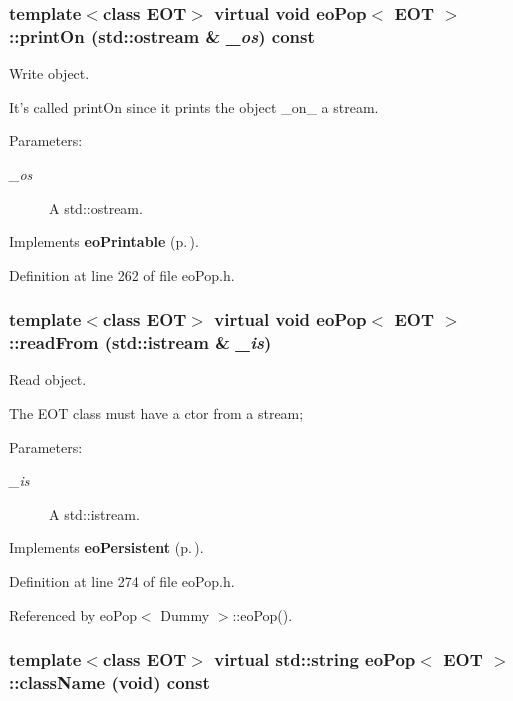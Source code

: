 \subsubsection{\setlength{\rightskip}{0pt plus 5cm}template$<$class EOT$>$ virtual void {\bf eo\-Pop}$<$ {\bf EOT} $>$::print\-On (std::ostream \& {\em \_\-os}) const\hspace{0.3cm}{\tt  [inline, virtual]}}\label{classeo_pop_a18}


Write object. 

It's called print\-On since it prints the object \_\-on\_\- a stream. \begin{Desc}
\item[Parameters:]
\begin{description}
\item[{\em \_\-os}]A std::ostream. \end{description}
\end{Desc}


Implements {\bf eo\-Printable} {\rm (p.\,\pageref{classeo_printable_a1})}.

Definition at line 262 of file eo\-Pop.h.
\subsubsection{\setlength{\rightskip}{0pt plus 5cm}template$<$class EOT$>$ virtual void {\bf eo\-Pop}$<$ {\bf EOT} $>$::read\-From (std::istream \& {\em \_\-is})\hspace{0.3cm}{\tt  [inline, virtual]}}\label{classeo_pop_z19_0}


Read object. 

The EOT class must have a ctor from a stream; \begin{Desc}
\item[Parameters:]
\begin{description}
\item[{\em \_\-is}]A std::istream. \end{description}
\end{Desc}


Implements {\bf eo\-Persistent} {\rm (p.\,\pageref{classeo_persistent_a1})}.

Definition at line 274 of file eo\-Pop.h.

Referenced by eo\-Pop$<$ Dummy $>$::eo\-Pop().
\subsubsection{\setlength{\rightskip}{0pt plus 5cm}template$<$class EOT$>$ virtual std::string {\bf eo\-Pop}$<$ {\bf EOT} $>$::class\-Name (void) const\hspace{0.3cm}{\tt  [inline, virtual]}}\label{classeo_pop_z19_1}


